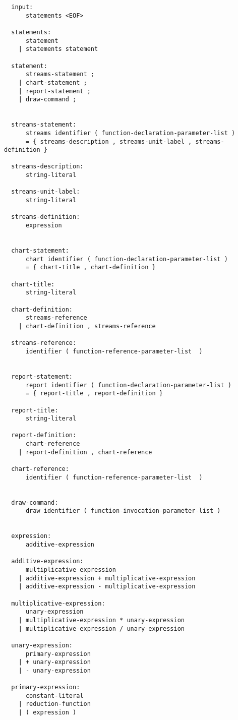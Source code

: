\begin{verbatim}
  input:
      statements <EOF>
      
  statements:
      statement
    | statements statement
    
  statement: 
      streams-statement ;
    | chart-statement ;
    | report-statement ;
    | draw-command ;
   

  streams-statement:
      streams identifier ( function-declaration-parameter-list )
      = { streams-description , streams-unit-label , streams-definition }
  
  streams-description:
      string-literal
      
  streams-unit-label:
      string-literal
  
  streams-definition:
      expression


  chart-statement:
      chart identifier ( function-declaration-parameter-list ) 
      = { chart-title , chart-definition }

  chart-title:
      string-literal
    
  chart-definition:
      streams-reference 
    | chart-definition , streams-reference

  streams-reference:
      identifier ( function-reference-parameter-list  )


  report-statement:
      report identifier ( function-declaration-parameter-list ) 
      = { report-title , report-definition }

  report-title:
      string-literal

  report-definition:
      chart-reference 
    | report-definition , chart-reference

  chart-reference:
      identifier ( function-reference-parameter-list  )
    
    
  draw-command:
      draw identifier ( function-invocation-parameter-list )
      
  
  expression:
      additive-expression

  additive-expression:
      multiplicative-expression
    | additive-expression + multiplicative-expression
    | additive-expression - multiplicative-expression

  multiplicative-expression:
      unary-expression
    | multiplicative-expression * unary-expression
    | multiplicative-expression / unary-expression

  unary-expression:
      primary-expression
    | + unary-expression
    | - unary-expression

  primary-expression:
      constant-literal
    | reduction-function
    | ( expression )


\end{verbatim}
